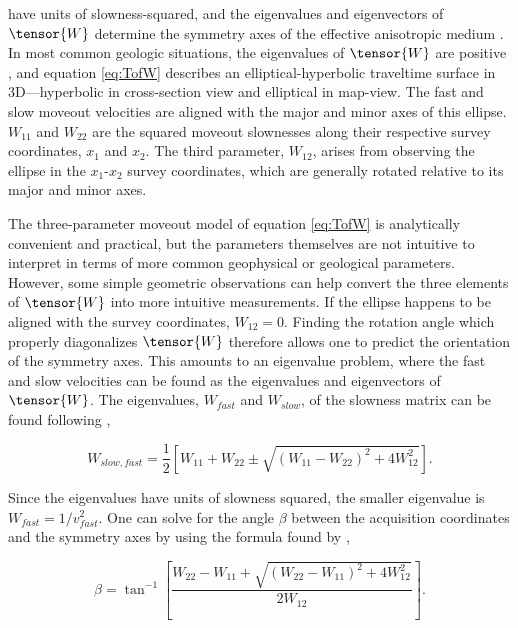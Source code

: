 \noindent have units of slowness-squared, and the eigenvalues and eigenvectors of $\tensor{W}$ determine the symmetry axes of the effective anisotropic medium \cite[]{GEO63-03-10791092}. 
In most common geologic situations, the eigenvalues of $\tensor{W}$ are positive \cite[]{tsvankin05}, and equation \ref{eq:TofW} describes an elliptical-hyperbolic traveltime surface in 3D---hyperbolic in cross-section view and elliptical in map-view.
 The fast and slow moveout velocities are aligned with the major and minor axes of this ellipse. 
$W_{11}$ and $W_{22}$ are the squared moveout slownesses along their respective survey coordinates, $x_1$ and $x_2$.
 The third parameter, $W_{12}$, arises from observing the ellipse in the $x_1$-$x_2$ survey coordinates, which are generally rotated relative to its major and minor axes.  

The three-parameter moveout model of equation \ref{eq:TofW} is analytically convenient and practical, but the parameters themselves are not intuitive to interpret in terms of more common geophysical or geological parameters.
However, some simple geometric observations can help convert the three elements of $\tensor{W}$ into more intuitive measurements.
If the ellipse happens to be aligned with the survey coordinates, $W_{12}=0$. 
Finding the rotation angle which properly diagonalizes $\tensor{W}$ therefore allows one to predict the orientation of the symmetry axes.  
This amounts to an eigenvalue problem, where the fast and slow velocities can be found as the eigenvalues and eigenvectors of $\tensor{W}$.   
The eigenvalues, $W_{fast}$ and $W_{slow}$, of the slowness matrix can be found following \cite{GEO63-03-10791092},

\begin{equation}
\label{eq:lambda}
W_{slow,fast}=\frac{1}{2}\left[ W_{11}+W_{22}\pm \sqrt{(W_{11}-W_{22})^2+4W_{12}^2}\right].
\end{equation}

\noindent Since the eigenvalues have units of slowness squared, the smaller eigenvalue is $W_{fast}=1/v_{fast}^2$.
One can solve for the angle $\beta $ between the acquisition coordinates and the symmetry axes by using the formula found by \cite{GEO63-03-10791092},

\begin{equation}
\label{eq:beta}
\beta = \tan ^{-1}\left[ \frac{W_{22}-W_{11}+\sqrt{\left(W_{22}-W_{11}\right)^2+4W_{12}^2}}{2W_{12}}\right].
\end{equation}


